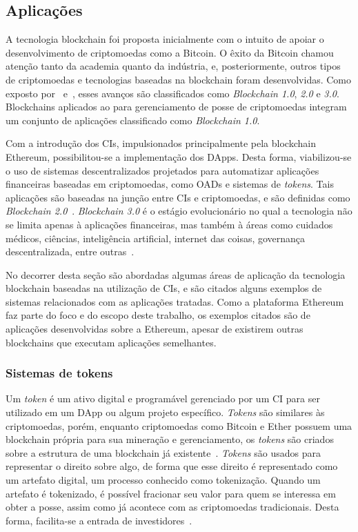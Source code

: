 \subsection{Aplicações} \label{tex:fund:ethereum:aplica}

A tecnologia blockchain foi proposta inicialmente com o intuito de apoiar o desenvolvimento de criptomoedas como a Bitcoin. O êxito da Bitcoin chamou atenção tanto da academia quanto da indústria, e, posteriormente, outros tipos de criptomoedas e tecnologias baseadas na blockchain foram desenvolvidas. Como exposto por~ e~, esses avanços são classificados como \textit{Blockchain 1.0}, \textit{2.0} e \textit{3.0}. Blockchains aplicados ao para gerenciamento de posse de criptomoedas integram um conjunto de aplicações classificado como \textit{Blockchain 1.0}. 

Com a introdução dos CIs, impulsionados principalmente pela blockchain Ethereum, possibilitou-se a implementação dos DApps. Desta forma, viabilizou-se o uso de sistemas descentralizados projetados para automatizar aplicações financeiras baseadas em criptomoedas, como OADs e sistemas de \textit{tokens}. Tais aplicações são baseadas na junção entre CIs e criptomoedas, e são definidas como \textit{Blockchain 2.0}~\cite{maesa2020blockchain3.0}. \textit{Blockchain 3.0} é o estágio evolucionário no qual a tecnologia não se limita apenas à aplicações financeiras, mas também à áreas como cuidados médicos, ciências, inteligência artificial, internet das coisas, governança descentralizada, entre outras~\cite{maesa2020blockchain3.0}. 

No decorrer desta seção são abordadas algumas áreas de aplicação da tecnologia blockchain baseadas na utilização de CIs, e são citados alguns exemplos de sistemas relacionados com as aplicações tratadas. Como a plataforma Ethereum faz parte do foco e do escopo deste trabalho, os exemplos citados são de aplicações desenvolvidas sobre a Ethereum, apesar de existirem outras blockchains que executam aplicações semelhantes.

\subsubsection*{\textbf{Sistemas de tokens}} 

Um \textit{token}  é um ativo digital e programável gerenciado por um CI para ser utilizado em um DApp ou algum projeto específico. \textit{Tokens} são similares às criptomoedas, porém, enquanto criptomoedas como Bitcoin e Ether possuem uma blockchain própria para sua mineração e gerenciamento, os \textit{tokens} são criados sobre a estrutura de uma blockchain já existente~\cite{angelo2020tokens}. \textit{Tokens} são usados para representar o direito sobre algo, de forma que esse direito é representado como um artefato digital, um processo conhecido como tokenização. Quando um artefato é tokenizado, é possível fracionar seu valor para quem se interessa em obter a posse, assim como já acontece com as criptomoedas tradicionais. Desta forma, facilita-se a entrada de investidores~\cite{angelo2020tokens}. 

